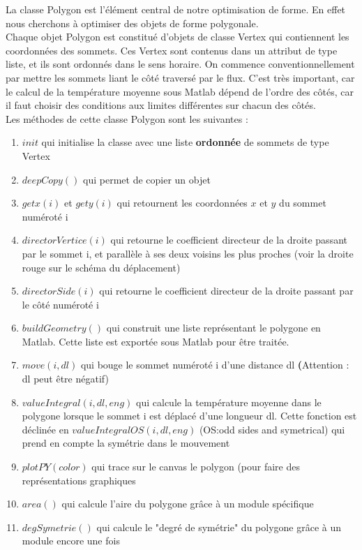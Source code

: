 \documentclass[a4paper,reqno]{article}
\begin{document}
La classe Polygon est l'élément central de notre optimisation de forme. En effet nous cherchons à optimiser des objets de forme polygonale. \\
Chaque objet Polygon est constitué d'objets de classe Vertex qui contiennent les coordonnées des sommets. Ces Vertex sont contenus dans un attribut de type liste, et ils sont ordonnés dans le sens horaire. On commence conventionnellement par mettre les sommets liant le côté traversé par le flux. C'est très important, car le calcul de la température moyenne sous Matlab dépend de l'ordre des côtés, car il faut choisir des conditions aux limites différentes sur chacun des côtés.\\
Les méthodes de cette classe Polygon sont les suivantes : 
\begin{enumerate}
\item $init$ qui initialise la classe avec une liste \textbf{ordonnée} de sommets de type Vertex
\item $deepCopy()$ qui permet de copier un objet
\item $getx(i)$ et $gety(i)$ qui retournent les coordonnées $x$ et $y$ du sommet numéroté i 
\item $directorVertice(i)$ qui retourne le coefficient directeur de la droite passant par le sommet i, et parallèle à ses deux voisins les plus proches (voir la droite rouge sur le schéma du déplacement)
\item $directorSide(i)$ qui retourne le coefficient directeur de la droite passant par le côté numéroté i 
\item $buildGeometry()$ qui construit une liste représentant le polygone en Matlab. Cette liste est exportée sous Matlab pour être traitée. 
\item $move(i, dl)$ qui bouge le sommet numéroté i d'une distance dl \textbf(Attention : dl peut être négatif)
\item $valueIntegral(i, dl, eng)$ qui calcule la température moyenne dans le polygone lorsque le sommet i est déplacé d'une longueur dl. Cette fonction est déclinée en $valueIntegralOS(i, dl, eng)$ (OS:odd sides and symetrical) qui prend en compte la symétrie dans le mouvement
\item $plotPY(color)$ qui trace sur le canvas le polygon (pour faire des représentations graphiques
\item $area()$ qui calcule l'aire du polygone grâce à un module spécifique
\item $degSymetrie()$ qui calcule le "degré de symétrie" du polygone grâce à un module encore une fois 
\
\end{enumerate}
\newpage
\end{document}
